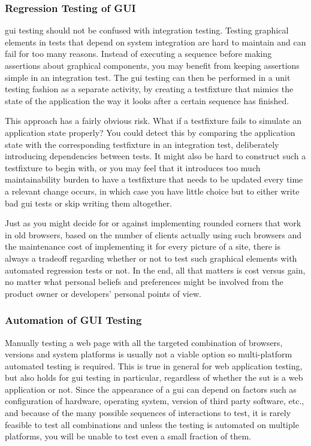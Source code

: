 \documentclass[11pt]{article}
\begin{document}
\subsubsection{Regression Testing of GUI}

\gls{gui} testing should not be confused with integration testing. Testing graphical elements in tests that depend on system integration are hard to maintain and can fail for too many reasons. Instead of executing a sequence before making assertions about graphical components, you may benefit from keeping assertions simple in an integration test. The \gls{gui} testing can then be performed in a unit testing fashion as a separate activity, by creating a \gls{testfixture} that mimics the state of the application the way it looks after a certain sequence has finished.

This approach has a fairly obvious risk. What if a \gls{testfixture} fails to simulate an application state properly? You could detect this by comparing the application state with the corresponding \gls{testfixture} in an integration test, deliberately introducing dependencies between tests. It might also be hard to construct such a \gls{testfixture} to begin with, or you may feel that it introduces too much maintainability burden to have a \gls{testfixture} that needs to be updated every time a relevant change occurs, in which case you have little choice but to either write bad \gls{gui} tests or skip writing them altogether.

Just as you might decide for or against implementing rounded corners that work in old browsers, based on the number of clients actually using such browsers and the maintenance cost of implementing it for every picture of a site, there is always a tradeoff regarding whether or not to test such graphical elements with automated regression tests or not. In the end, all that matters is cost versus gain, no matter what personal beliefs and preferences might be involved from the product owner or developers' personal points of view. \cite[questions~40-44]{Ahnve}

\subsubsection{Automation of GUI Testing}

Manually testing a web page with all the targeted combination of browsers, versions and system platforms is usually not a viable option \cite{TestSwarm} so multi-platform automated testing is required. This is true in general for web application testing, but also holds for \gls{gui} testing in particular, regardless of whether the \gls{sut} is a web application or not. Since the appearance of a \gls{gui} can depend on factors such as configuration of hardware, operating system, version of third party software, etc., and because of the many possible sequences of interactions to test, it is rarely feasible to test all combinations and unless the testing is automated on multiple platforms, you will be unable to test even a small fraction of them.
\end{document}
